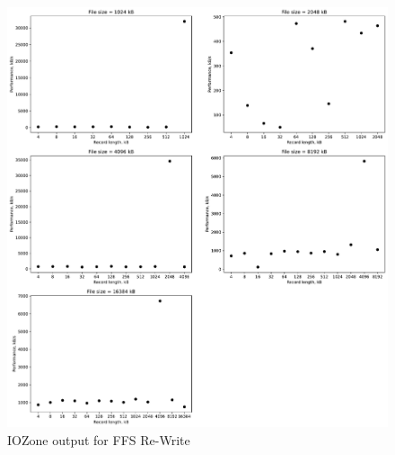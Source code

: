 \begin{figure}[!htb]
	\label{fig:app_bench_ffs_re_write}
	\begin{center}
		\includegraphics[width=1.0\textwidth]{figures/benchmarking/ffs/Re-Write.pdf}
	\end{center}
	\caption{IOZone output for \gls{FFS} Re-Write}
\end{figure}

